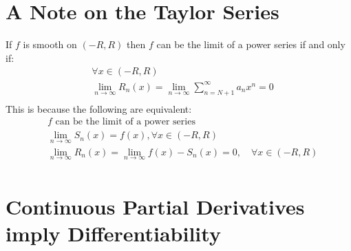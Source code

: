 \documentclass[11pt,a4paper]{article}
\theoremstyle{definition}
\theoremstyle{plain}
\begin{document}
	\section{A Note on the Taylor Series}
	If $f$ is smooth on $(-R,R)$ then $f$ can be the limit of a power series if and only if:
	\begin{align*}
		&\forall x\in(-R,R) \\
		&\lim_{n\to\infty}{R_n(x) = 
		 \lim_{n\to\infty}{\sum_{n=N+1}^\infty}{a_nx^n} = 0} \\
	\end{align*}
	This is because the following are equivalent:
	\begin{align*}
	    &\text{$f$ can be the limit of a power series} \\
		&\lim_{n\to\infty}{S_n(x)=f(x), \forall x\in(-R,R)} \\
		&\lim_{n\to\infty}{R_n(x)} = 
		\lim_{n\to\infty}{f(x)-S_n(x)=0, \quad \forall x\in(-R,R)} \\
	\end{align*}

	\newpage
	
	\section{Continuous Partial Derivatives imply Differentiability}
\end{document}
